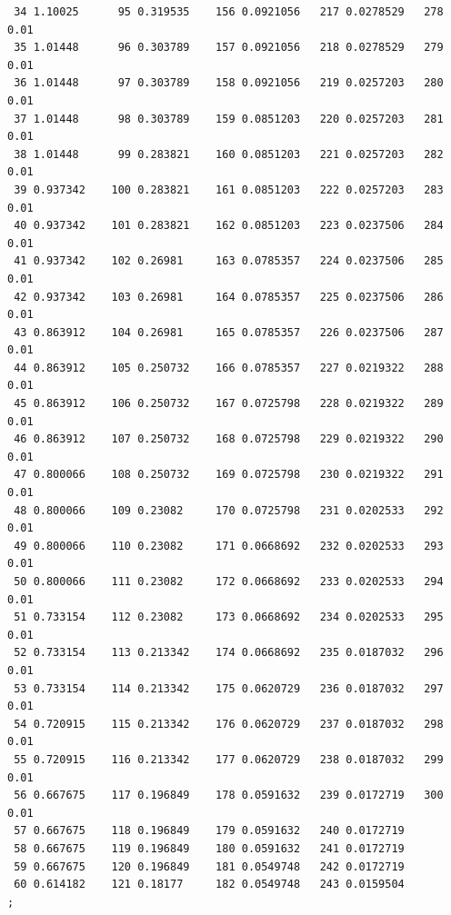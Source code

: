 \documentclass{article}
\begin{document}
\begin{verbatim}
 34 1.10025      95 0.319535    156 0.0921056   217 0.0278529   278 0.01
 35 1.01448      96 0.303789    157 0.0921056   218 0.0278529   279 0.01
 36 1.01448      97 0.303789    158 0.0921056   219 0.0257203   280 0.01
 37 1.01448      98 0.303789    159 0.0851203   220 0.0257203   281 0.01
 38 1.01448      99 0.283821    160 0.0851203   221 0.0257203   282 0.01
 39 0.937342    100 0.283821    161 0.0851203   222 0.0257203   283 0.01
 40 0.937342    101 0.283821    162 0.0851203   223 0.0237506   284 0.01
 41 0.937342    102 0.26981     163 0.0785357   224 0.0237506   285 0.01
 42 0.937342    103 0.26981     164 0.0785357   225 0.0237506   286 0.01
 43 0.863912    104 0.26981     165 0.0785357   226 0.0237506   287 0.01
 44 0.863912    105 0.250732    166 0.0785357   227 0.0219322   288 0.01
 45 0.863912    106 0.250732    167 0.0725798   228 0.0219322   289 0.01
 46 0.863912    107 0.250732    168 0.0725798   229 0.0219322   290 0.01
 47 0.800066    108 0.250732    169 0.0725798   230 0.0219322   291 0.01
 48 0.800066    109 0.23082     170 0.0725798   231 0.0202533   292 0.01
 49 0.800066    110 0.23082     171 0.0668692   232 0.0202533   293 0.01
 50 0.800066    111 0.23082     172 0.0668692   233 0.0202533   294 0.01
 51 0.733154    112 0.23082     173 0.0668692   234 0.0202533   295 0.01
 52 0.733154    113 0.213342    174 0.0668692   235 0.0187032   296 0.01
 53 0.733154    114 0.213342    175 0.0620729   236 0.0187032   297 0.01
 54 0.720915    115 0.213342    176 0.0620729   237 0.0187032   298 0.01
 55 0.720915    116 0.213342    177 0.0620729   238 0.0187032   299 0.01
 56 0.667675    117 0.196849    178 0.0591632   239 0.0172719   300 0.01
 57 0.667675    118 0.196849    179 0.0591632   240 0.0172719
 58 0.667675    119 0.196849    180 0.0591632   241 0.0172719
 59 0.667675    120 0.196849    181 0.0549748   242 0.0172719
 60 0.614182    121 0.18177     182 0.0549748   243 0.0159504
;


\end{verbatim}
\end{document}
